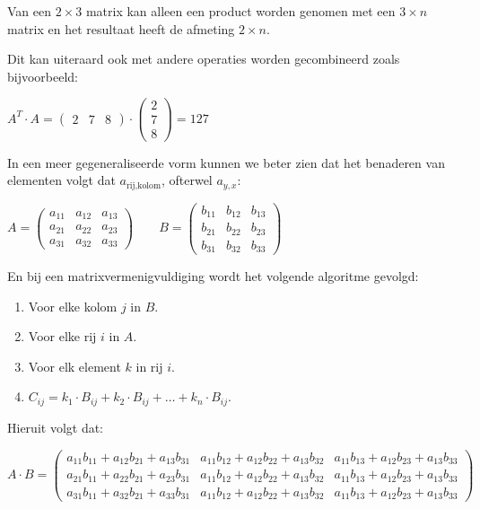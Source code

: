 \documentclass[11pt]{article}
\providecommand{\tightlist}{%
      \setlength{\itemsep}{0pt}\setlength{\parskip}{0pt}}
\begin{document}
Van een \(2\times3\) matrix kan alleen een product worden genomen met
een \(3\times n\) matrix en het resultaat heeft de afmeting
\(2\times n\).

Dit kan uiteraard ook met andere operaties worden gecombineerd zoals
bijvoorbeeld:

\(A^T \cdot A = \begin{pmatrix} 2 & 7 & 8 \end{pmatrix} \cdot \begin{pmatrix} 2 \\ 7 \\ 8 \end{pmatrix} = 127\)

In een meer gegeneraliseerde vorm kunnen we beter zien dat het benaderen
van elementen volgt dat \(a_{\text{rij},\text{kolom}}\), ofterwel
\(a_{y,x}\):

\(A = \begin{pmatrix} a_{11} & a_{12} & a_{13} \\ a_{21} & a_{22} & a_{23} \\ a_{31} & a_{32} & a_{33} \end{pmatrix} \qquad B = \begin{pmatrix} b_{11} & b_{12} & b_{13} \\ b_{21} & b_{22} & b_{23} \\ b_{31} & b_{32} & b_{33} \end{pmatrix}\)

En bij een matrixvermenigvuldiging wordt het volgende algoritme gevolgd:

\begin{enumerate}
\def\labelenumi{\arabic{enumi}.}
\tightlist
\item
  Voor elke kolom \(j\) in \(B\).
\item
  Voor elke rij \(i\) in \(A\).
\item
  Voor elk element \(k\) in rij \(i\).
\item
  \(C_{ij} = k_1 \cdot B_{ij} + k_2 \cdot B_{ij} + \ldots + k_n \cdot B_{ij}\).
\end{enumerate}

Hieruit volgt dat:

\(A \cdot B = \begin{pmatrix} a_{11}b_{11} + a_{12}b_{21} + a_{13}b_{31} & a_{11}b_{12} + a_{12}b_{22} + a_{13}b_{32} & a_{11}b_{13} + a_{12}b_{23} + a_{13}b_{33} \\ a_{21}b_{11} + a_{22}b_{21} + a_{23}b_{31} & a_{11}b_{12} + a_{12}b_{22} + a_{13}b_{32} & a_{11}b_{13} + a_{12}b_{23} + a_{13}b_{33}\\ a_{31}b_{11} + a_{32}b_{21} + a_{33}b_{31} & a_{11}b_{12} + a_{12}b_{22} + a_{13}b_{32} & a_{11}b_{13} + a_{12}b_{23} + a_{13}b_{33} \end{pmatrix}\)
\end{document}

